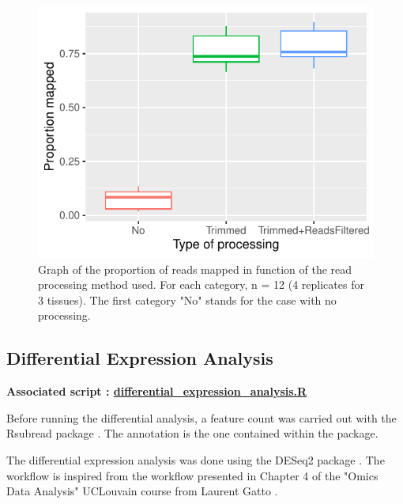 \documentclass[a4paper, 11pt]{article}
\begin{document}
\begin{multicols}{2}
\begin{figure}[H]
    \centering
    \includegraphics[width=1\columnwidth]{Figures/mapping_props.pdf}
    \caption{\footnotesize{Graph of the proportion of reads mapped in function of the read processing method used. For each category, n = 12 (4 replicates for 3 tissues). The first category "No" stands for the case with no processing.}}
    \label{fig:mapping}
\end{figure}


\subsection{Differential Expression Analysis}
\begin{scriptsize}
	\textbf{Associated script : \href{https://github.com/leopoldguyot/BINF-402_Transcriptomic_Project/blob/main/differential_expression_analysis.R}{differential\_expression\_analysis.R}} 
\end{scriptsize}


Before running the differential analysis, a feature count was carried out with the Rsubread package \citep{Rsubread}. The annotation is the one contained within the package. 

The differential expression analysis was done using the DESeq2 package \citep{DESeq2}. The workflow is inspired from the workflow presented in Chapter 4 of the "Omics Data Analysis" UCLouvain course from Laurent Gatto \citep{Gatto_Loriot}.


\end{multicols}
\end{document}
